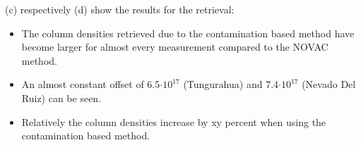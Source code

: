 \documentclass  [
  paper    = a4,
  BCOR     = 10mm,
  twoside,
  fontsize = 12pt,
  fleqn,
  toc      = bibnumbered,
  toc      = listofnumbered,
  numbers  = noendperiod,
  headings = normal,
  listof   = leveldown,
  version  = 3.03
]                                       {scrreprt}
\begin{document}
	 (c) respectively (d) show the results for the   retrieval:
	\begin{itemize}
		\item The   column densities retrieved due to the contamination based method have become larger for almost every measurement compared to the NOVAC method.
		\item An almost constant offset of 6.5$\cdot 10 ^{17}$ (Tungurahua) and 7.4$\cdot 10 ^{17}$ (Nevado Del Ruiz) can be seen.
		\item  Relatively the   column densities increase by xy percent when using the contamination based method.
	\end{itemize}


	\begin{figure}[h!]	

\end{figure}
\end{document}
